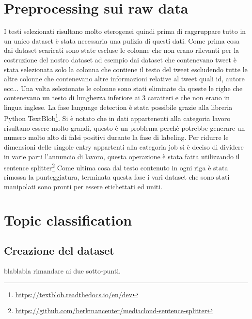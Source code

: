 \section{Preprocessing sui raw data}
\label{sec:preprocessingraw}
I testi selezionati risultano molto eterogenei quindi prima di raggruppare tutto in un unico dataset è stata necessaria una pulizia di questi dati.\newline
Come prima cosa dai dataset scaricati sono state escluse le colonne che non erano rilevanti per la costruzione del nostro dataset ad esempio dai dataset che contenevano tweet è stata selezionata solo la colonna che contiene il testo del tweet escludendo tutte le altre colonne che contenevano altre informazioni relative al tweet quali id, autore ecc...\newline
Una volta selezionate le colonne sono stati eliminate da queste le righe che contenevano un testo di lunghezza inferiore ai 3 caratteri e che non erano in lingua inglese. La fase language detection è stata possibile grazie alla libreria Python  TextBlob\footnote{\url{https://textblob.readthedocs.io/en/dev}}.\newline
Si è notato che in dati appartenenti alla categoria lavoro risultano essere molto grandi, questo è un problema perchè potrebbe generare un numero molto alto di falsi positivi durante la fase di labeling. Per ridurre le dimensioni delle singole entry appartenti alla categoria job si è deciso di dividere in varie parti l'annuncio di lavoro, questa operazione è stata fatta utilizzando il sentence splitter\footnote{\url{https://github.com/berkmancenter/mediacloud-sentence-splitter}} \newline
Come ultima cosa dal testo contenuto in ogni riga è stata rimossa la punteggiatura, terminata questa fase i vari dataset che sono stati manipolati sono pronti per essere etichettati ed uniti.

\section{Topic classification}

\subsection{Creazione del dataset}
\label{ssec:dataset}
blablabla rimandare ai due sotto-punti.
